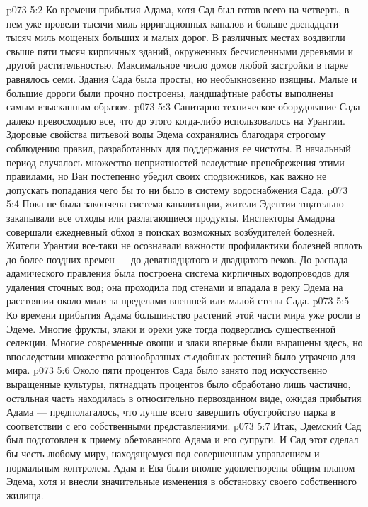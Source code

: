 \vs p073 5:2 Ко времени прибытия Адама, хотя Сад был готов всего на четверть, в нем уже провели тысячи миль ирригационных каналов и больше двенадцати тысяч миль мощеных больших и малых дорог. В различных местах воздвигли свыше пяти тысяч кирпичных зданий, окруженных бесчисленными деревьями и другой растительностью. Максимальное число домов любой застройки в парке равнялось семи. Здания Сада была просты, но необыкновенно изящны. Малые и большие дороги были прочно построены, ландшафтные работы выполнены самым изысканным образом.
\vs p073 5:3 Санитарно\hyp{}техническое оборудование Сада далеко превосходило все, что до этого когда\hyp{}либо использовалось на Урантии. Здоровые свойства питьевой воды Эдема сохранялись благодаря строгому соблюдению правил, разработанных для поддержания ее чистоты. В начальный период случалось множество неприятностей вследствие пренебрежения этими правилами, но Ван постепенно убедил своих сподвижников, как важно не допускать попадания чего бы то ни было в систему водоснабжения Сада.
\vs p073 5:4 Пока не была закончена система канализации, жители Эдентии тщательно закапывали все отходы или разлагающиеся продукты. Инспекторы Амадона совершали ежедневный обход в поисках возможных возбудителей болезней. Жители Урантии все\hyp{}таки не осознавали важности профилактики болезней вплоть до более поздних времен --- до девятнадцатого и двадцатого веков. До распада адамического правления была построена система кирпичных водопроводов для удаления сточных вод; она проходила под стенами и впадала в реку Эдема на расстоянии около мили за пределами внешней или малой стены Сада.
\vs p073 5:5 Ко времени прибытия Адама большинство растений этой части мира уже росли в Эдеме. Многие фрукты, злаки и орехи уже тогда подверглись существенной селекции. Многие современные овощи и злаки впервые были выращены здесь, но впоследствии множество разнообразных съедобных растений было утрачено для мира.
\vs p073 5:6 Около пяти процентов Сада было занято под искусственно выращенные культуры, пятнадцать процентов было обработано лишь частично, остальная часть находилась в относительно первозданном виде, ожидая прибытия Адама --- предполагалось, что лучше всего завершить обустройство парка в соответствии с его собственными представлениями.
\vs p073 5:7 Итак, Эдемский Сад был подготовлен к приему обетованного Адама и его супруги. И Сад этот сделал бы честь любому миру, находящемуся под совершенным управлением и нормальным контролем. Адам и Ева были вполне удовлетворены общим планом Эдема, хотя и внесли значительные изменения в обстановку своего собственного жилища.
